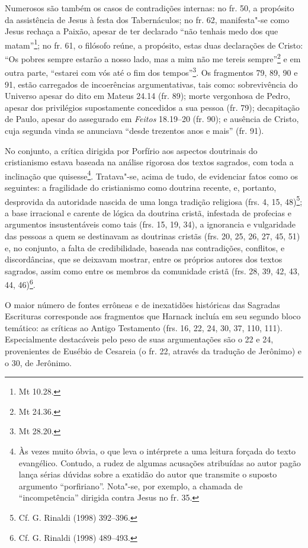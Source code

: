 Numerosos são também os casos de contradições internas: no fr. 50, a
propósito da assistência de Jesus à festa dos Tabernáculos; no fr. 62,
manifesta"-se como Jesus rechaça a Paixão, apesar de ter declarado “não
tenhais medo dos que matam”\footnote{
Mt 10.28.}; no fr. 61, o filósofo reúne, a propósito,
estas duas declarações de Cristo: “Os pobres sempre estarão a nosso
lado, mas a mim não me tereis sempre”\footnote{ 
Mt 24.36.} e em outra parte, “estarei com
vós até o fim dos tempos”\footnote{
Mt 28.20.}. Os fragmentos 79, 89, 90 e 91, estão
carregados de incoerências argumentativas, tais como: sobrevivência do
Universo apesar do dito em Mateus 24.14 (fr. 89); morte vergonhosa de
Pedro, apesar dos privilégios supostamente concedidos a sua pessoa (fr.
79); decapitação de Paulo, apesar do assegurado em \textit{Feitos}
18.19--20 (fr. 90); e ausência de Cristo, cuja segunda vinda se
anunciava “desde trezentos anos e mais” (fr. 91).

No conjunto, a crítica dirigida por Porfírio aos aspectos doutrinais do
cristianismo estava baseada na análise rigorosa dos textos sagrados,
com toda a inclinação que quisesse\footnote{ Às vezes muito óbvia, o
que leva o intérprete a uma leitura forçada do texto evangélico.
Contudo, a rudez de algumas acusações atribuídas ao autor pagão lança
sérias dúvidas sobre a exatidão do autor que transmite o suposto
argumento “porfiriano”. Nota"-se, por exemplo, a chamada de
“incompetência” dirigida contra Jesus no fr. 35.}. 
Tratava"-se, acima de tudo, de evidenciar fatos
como os seguintes: a fragilidade do cristianismo como doutrina recente,
e, portanto, desprovida da autoridade nascida de uma longa tradição
religiosa (frs. 4, 15, 48)\footnote{ Cf. G. Rinaldi (1998) 392--396.}; a
base irracional e carente de lógica da doutrina cristã, infestada de
profecias e argumentos insustentáveis como tais (frs. 15, 19, 34), a
ignorancia e vulgaridade das pessoas a quem se destinavam as doutrinas
cristãs (frs. 20, 25, 26, 27, 45, 51) e, no conjunto, a falta de
credibilidade, baseada nas contradições, conflitos, e discordâncias,
que se deixavam mostrar, entre os próprios autores dos textos sagrados,
assim como entre os membros da comunidade cristã (frs. 28, 39, 42, 43,
44, 46)\footnote{ Cf. G. Rinaldi (1998) 489--493.}.

O maior número de fontes errôneas e de inexatidões históricas das Sagradas
Escrituras corresponde aos fragmentos que Harnack incluía em seu
segundo bloco temático: as críticas ao Antigo Testamento (frs. 16, 22,
24, 30, 37, 110, 111). Especialmente destacáveis pelo peso de suas
argumentações são o 22 e 24, provenientes de Eusébio de Cesareia (o fr.
22, através da tradução de Jerônimo) e o 30, de Jerônimo.

